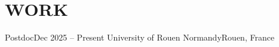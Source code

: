 \section{WORK}
\resumeSubHeadingListStart

  \resumeSubheading
    {Postdoc}{Dec 2025 -- Present}
    {University of Rouen Normandy}{Rouen, France}
  \resumeItemListStart
  \resumeItemListEnd

\resumeSubHeadingListEnd
